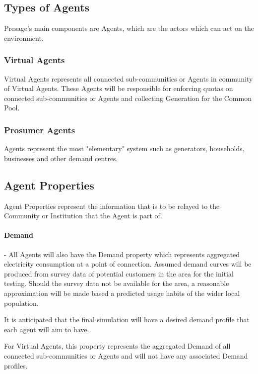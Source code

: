 \subsection*{Types of Agents}
Presage's main components are Agents, which are the actors which can act on the environment.
\subsubsection*{Virtual Agents}
Virtual Agents represents all connected sub-communities or Agents in community of Virtual Agents. These Agents will be responsible for enforcing quotas on connected sub-communities or Agents and collecting Generation for the Common Pool. 

\subsubsection*{Prosumer Agents}
Agents represent the most "elementary" system such as generators, households, businesses and other demand centres.

\subsection*{Agent Properties}
Agent Properties represent the information that is to be relayed to the Community or Institution that the Agent is part of.
\paragraph*{Demand} - All Agents will also have the Demand property which represents aggregated electricity consumption at a point of connection. Assumed demand curves will be produced from survey data of potential customers in the area for the initial testing. Should the survey data not be available for the area, a reasonable approximation will be made based a predicted usage habits of the wider local population.

It is anticipated that the final simulation will have a desired demand profile that each agent will aim to have. 

For Virtual Agents, this property represents the aggregated Demand of all connected sub-communities or Agents and will not have any associated Demand profiles.

